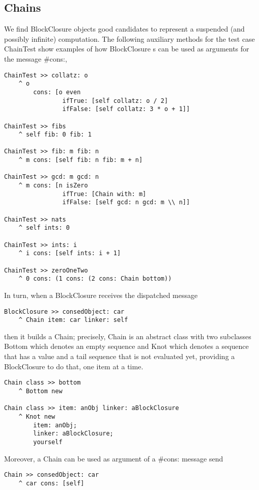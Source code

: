 \documentclass[a4paper,11pt]{article}
\newcommand{\ct}[1]{{\textsf{#1}}\xspace}
\begin{document}
\subsection{Chains}

We find \ct{BlockClosure} objects good candidates to
represent a suspended (and possibly infinite) computation. The following
auxiliary methods for the test case \ct{ChainTest} show examples of how
\ct{BlockClosure}s can be used as arguments for the message \ct{\#cons:},
\begin{verbatim}
ChainTest >> collatz: o
    ^ o
        cons: [o even
                ifTrue: [self collatz: o / 2]
                ifFalse: [self collatz: 3 * o + 1]]

ChainTest >> fibs
    ^ self fib: 0 fib: 1

ChainTest >> fib: m fib: n
    ^ m cons: [self fib: n fib: m + n]

ChainTest >> gcd: m gcd: n
    ^ m cons: [n isZero
                ifTrue: [Chain with: m]
                ifFalse: [self gcd: n gcd: m \\ n]]

ChainTest >> nats
    ^ self ints: 0

ChainTest >> ints: i
    ^ i cons: [self ints: i + 1]

ChainTest >> zeroOneTwo
    ^ 0 cons: (1 cons: (2 cons: Chain bottom))
\end{verbatim}
In turn, when a \ct{BlockClosure} receives the dispatched message
\begin{verbatim}
BlockClosure >> consedObject: car
    ^ Chain item: car linker: self
\end{verbatim}
then it builds a \ct{Chain}; precisely, \ct{Chain} is an abstract class with
two subclasses \ct{Bottom} which denotes an empty sequence and \ct{Knot} which
denotes a sequence that has a value and a tail sequence that is not evaluated
yet, providing a \ct{BlockClosure} to do that, one item at a time.
\begin{verbatim}
Chain class >> bottom
    ^ Bottom new

Chain class >> item: anObj linker: aBlockClosure
    ^ Knot new
        item: anObj;
        linker: aBlockClosure;
        yourself
\end{verbatim}
Moreover, a \ct{Chain} can be used as argument of a \ct{\#cons:} message send
\begin{verbatim}
Chain >> consedObject: car
    ^ car cons: [self]
\end{verbatim}
\end{document}
